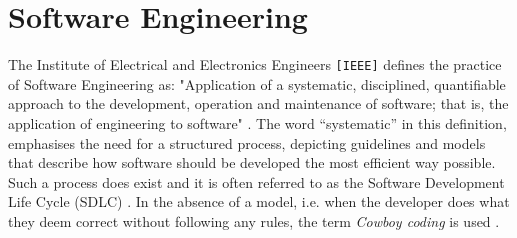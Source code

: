 
\chapter{Software Engineering}
The Institute of Electrical and Electronics Engineers \texttt{[IEEE]} defines the practice of Software Engineering as: "Application of a systematic, disciplined, quantifiable approach to the development, operation and maintenance of software; that is, the application of engineering to software" \cite[p.~421]{8016712}. The word ``systematic'' in this definition, emphasises the need for a structured process, depicting guidelines and models that describe how software should be developed the most efficient way possible. Such a process does exist and it is often referred to as the Software Development Life Cycle (SDLC) \cite[p.~420]{8016712}. In the absence of a model, i.e. when the developer does what they deem correct without following any rules, the term \emph{Cowboy coding} is used \cite[p.~34]{landry2011iterative}.


